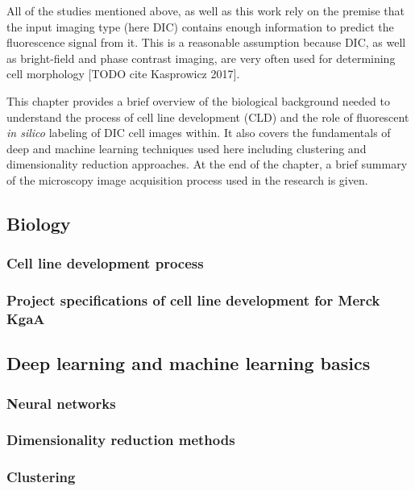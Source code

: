     All of the studies mentioned above, as well as this work rely on the premise that the input imaging type (here DIC) contains enough information to predict the fluorescence signal from it. This is a reasonable assumption because DIC, as well as bright-field and phase contrast imaging, are very often used for determining cell morphology [TODO cite Kasprowicz 2017].

    This chapter provides a brief overview of the biological background needed to understand the process of cell line development (CLD) and the role of fluorescent \textit{in silico} labeling of DIC cell images within. It also covers the fundamentals of deep and machine learning techniques used here including clustering and dimensionality reduction approaches. At the end of the chapter, a brief summary of the microscopy image acquisition process used in the research is given.

    \subsection{Biology}
        \subsubsection{Cell line development process}
        
        \subsubsection{Project specifications of cell line development for Merck KgaA}
        
    \subsection{Deep learning and machine learning basics}
        \subsubsection{Neural networks}
            
        \subsubsection{Dimensionality reduction methods}
            
        \subsubsection{Clustering}
            
